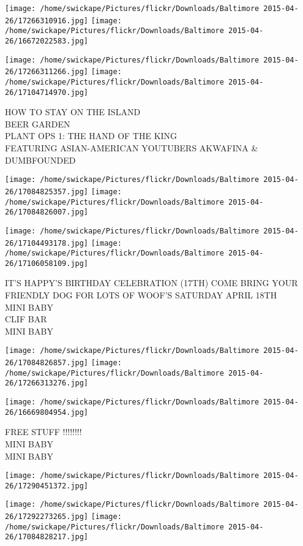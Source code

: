 \documentclass[10pt,letterpaper]{article}
\begin{document}
\texttt{[image: /home/swickape/Pictures/flickr/Downloads/Baltimore 2015-04-26/17266310916.jpg]}
\texttt{[image: /home/swickape/Pictures/flickr/Downloads/Baltimore 2015-04-26/16672022583.jpg]}

\texttt{[image: /home/swickape/Pictures/flickr/Downloads/Baltimore 2015-04-26/17266311266.jpg]}
\texttt{[image: /home/swickape/Pictures/flickr/Downloads/Baltimore 2015-04-26/17104714970.jpg]}

HOW TO STAY ON THE ISLAND\\
BEER GARDEN\\
PLANT OPS 1: THE HAND OF THE KING\\
FEATURING ASIAN{-}AMERICAN YOUTUBERS AKWAFINA \& DUMBFOUNDED\\
\pagebreak

\texttt{[image: /home/swickape/Pictures/flickr/Downloads/Baltimore 2015-04-26/17084825357.jpg]}
\texttt{[image: /home/swickape/Pictures/flickr/Downloads/Baltimore 2015-04-26/17084826007.jpg]}

\texttt{[image: /home/swickape/Pictures/flickr/Downloads/Baltimore 2015-04-26/17104493178.jpg]}
\texttt{[image: /home/swickape/Pictures/flickr/Downloads/Baltimore 2015-04-26/17106058109.jpg]}

IT'S HAPPY'S BIRTHDAY CELEBRATION (17TH) COME BRING YOUR FRIENDLY DOG FOR LOTS OF WOOF'S SATURDAY APRIL 18TH\\
MINI BABY\\
CLIF BAR\\
MINI BABY\\
\pagebreak

\texttt{[image: /home/swickape/Pictures/flickr/Downloads/Baltimore 2015-04-26/17084826857.jpg]}
\texttt{[image: /home/swickape/Pictures/flickr/Downloads/Baltimore 2015-04-26/17266313276.jpg]}

\texttt{[image: /home/swickape/Pictures/flickr/Downloads/Baltimore 2015-04-26/16669804954.jpg]}

FREE STUFF !!!!!!!!\\
MINI BABY\\
MINI BABY\\
\pagebreak

\texttt{[image: /home/swickape/Pictures/flickr/Downloads/Baltimore 2015-04-26/17290451372.jpg]}

\vspace{0.25in}
\texttt{[image: /home/swickape/Pictures/flickr/Downloads/Baltimore 2015-04-26/17292273265.jpg]}
\texttt{[image: /home/swickape/Pictures/flickr/Downloads/Baltimore 2015-04-26/17084828217.jpg]}
\end{document}
